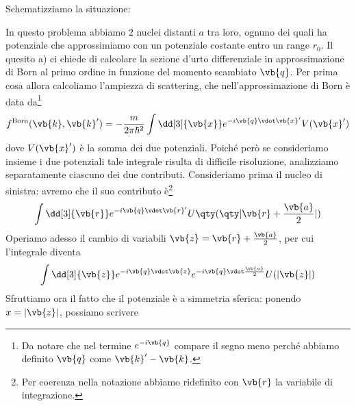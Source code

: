 \begin{soluzione}
   Schematizziamo la situazione:
   \begin{figure}[H]
      \centering
   \end{figure}
   In questo problema abbiamo 2 nuclei distanti $a$ tra loro, ognuno dei quali ha potenziale che approssimiamo con un potenziale costante entro un range $r_0$. Il quesito a) ci chiede di calcolare la sezione d'urto differenziale in approssimazione di Born al primo ordine in funzione del momento scambiato $\vb{q}$. Per prima cosa allora calcoliamo l'ampiezza di scattering, che nell'approssimazione di Born è data da\footnote{Da notare che nel termine $e^{-i \vb{q}}$ compare il segno meno perché abbiamo definito $\vb{q}$ come $\vb{k}'-\vb{k}$.}
   \begin{equation*}
      f^{\rm Born}(\vb{k},\vb{k}')
      =-\frac{m}{2\pi\hbar^2} \int \dd[3]{\vb{x}} e^{-i \vb{q} \vdot \vb{x}'} V(\vb{x}')
   \end{equation*}
   dove $V(\vb{x}')$ è la somma dei due potenziali. Poiché però se consideriamo insieme i due potenziali tale integrale risulta di difficile risoluzione, analizziamo separatamente ciascuno dei due contributi. Consideriamo prima il nucleo di sinistra: avremo che il suo contributo è\footnote{Per coerenza nella notazione abbiamo ridefinito con $\vb{r}$ la variabile di integrazione.}
   \begin{equation*}
      \int \dd[3]{\vb{r}} e^{-i \vb{q} \vdot \vb{r}'} U\qty( \qty| \vb{r} + \frac{\vb{a}}{2} | )
   \end{equation*}
   Operiamo adesso il cambio di variabili $\vb{z}=\vb{r} + \frac{\vb{a}}{2}$, per cui l'integrale diventa
   \begin{equation*}
      \int \dd[3]{\vb{z}} e^{-i \vb{q} \vdot \vb{z}} e^{-i \vb{q} \vdot \frac{\vb{a}}{2}} U(|\vb{z}|)
   \end{equation*}
   Sfruttiamo ora il fatto che il potenziale è a simmetria sferica: ponendo $x=|\vb{z}|$, possiamo scrivere

\end{soluzione}
